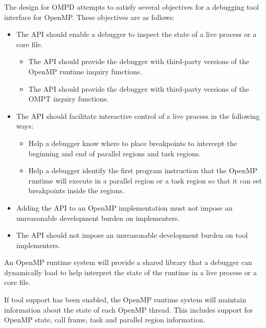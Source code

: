 The design for OMPD attempts to satisfy several objectives
for a debugging tool interface for OpenMP.
These objectives are as follows:
\begin{itemize}
\item
  The API should enable a debugger to inspect the state of a live process
  or a core file.
  \begin{itemize}
  \item
    The API should provide the debugger with third-party versions
    of the OpenMP runtime inquiry functions. 
  \item
    The API should provide the debugger with third-party versions
    of the OMPT inquiry functions.
  \end{itemize}
\item
  The API should facilitate interactive control of a live process
  in the following ways:
  \begin{itemize}
  \item
    Help a debugger know where to place breakpoints to intercept
    the beginning and end of parallel regions and task regions.
  \item
    Help a debugger identify the first program instruction that the
    OpenMP runtime will execute in a parallel region or a task region
    so that it can set breakpoints inside the regions.
  \end{itemize}
\item
  Adding the API to an OpenMP implementation must not impose
  an unreasonable development burden on implementers.
\item
  The API should not impose an unreasonable development burden
  on tool implementers.
\end{itemize}




An OpenMP runtime system will provide a shared library that a debugger
can dynamically load to help interpret the state of the runtime
in a live process
or a core file.

\sloppy
If tool support has been enabled, the OpenMP runtime system will maintain
information about the state of each OpenMP thread.
This includes support for OpenMP state, call frame,
task and parallel region information.


